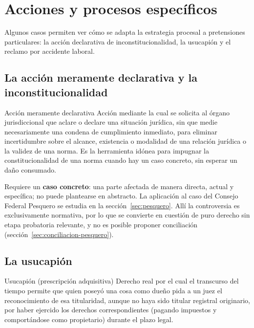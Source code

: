 \documentclass[12pt,oneside]{book}
\begin{document}
\chapter{Acciones y procesos específicos}

Algunos casos permiten ver cómo se adapta la estrategia procesal a pretensiones particulares: la acción declarativa de inconstitucionalidad, la usucapión y el reclamo por accidente laboral.

\section{La acción meramente declarativa y la inconstitucionalidad}

\begin{definicion}{Acción meramente declarativa}
Acción mediante la cual se solicita al órgano jurisdiccional que aclare o declare una situación jurídica, sin que medie necesariamente una condena de cumplimiento inmediato, para eliminar incertidumbre sobre el alcance, existencia o modalidad de una relación jurídica o la validez de una norma. Es la herramienta idónea para impugnar la constitucionalidad de una norma cuando hay un caso concreto, sin esperar un daño consumado.
\end{definicion}

Requiere un \textbf{caso concreto}: una parte afectada de manera directa, actual y específica; no puede plantearse en abstracto. La aplicación al caso del Consejo Federal Pesquero se estudia en la sección~\ref{sec:pesquero}. Allí la controversia es exclusivamente normativa, por lo que se convierte en cuestión de puro derecho sin etapa probatoria relevante, y no es posible proponer conciliación (sección~\ref{sec:conciliacion-pesquero}).

\section{La usucapión}\label{sec:usucapion}

\begin{definicion}{Usucapión (prescripción adquisitiva)}
Derecho real por el cual el transcurso del tiempo permite que quien poseyó una cosa como dueño pida a un juez el reconocimiento de esa titularidad, aunque no haya sido titular registral originario, por haber ejercido los derechos correspondientes (pagando impuestos y comportándose como propietario) durante el plazo legal.
\end{definicion}
\end{document}
